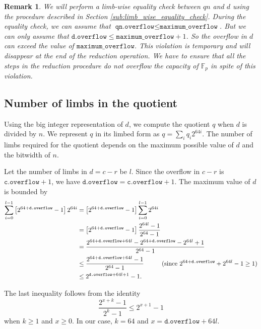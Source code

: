 \documentclass[a4paper, 12pt]{article}
\newtheorem*{remark}{Remark}
\begin{document}
\begin{remark}
  We will perform a limb-wise equality check between $qn$ and $d$ using the procedure described in Section \ref{sub:limb_wise_equality_check}. During the equality check, we can assume that $\texttt{qn.overflow} \le \texttt{maximum\_overflow}$. But we can only assume that $\texttt{d.overflow} \le \texttt{maximum\_overflow} + 1$. So the overflow in $d$ can exceed the value of $\texttt{maximum\_overflow}$. This violation is temporary and will disappear at the end of the reduction operation. We have to ensure that all the steps in the reduction procedure do not overflow the capacity of $\mathbb{F}_p$ in spite of this violation.
\end{remark}

\subsection{Number of limbs in the quotient}

Using the big integer representation of $d$, we compute the quotient $q$ when $d$ is divided by $n$. We represent $q$ in its limbed form as $q = \sum_{i} q_i 2^{64i}$. The number of limbs required for the quotient depends on the maximum possible value of $d$ and the bitwidth of $n$.

Let the number of limbs in $d = c-r$ be $l$. Since the overflow in $c-r$ is $\texttt{c.overflow}+1$, we have $\texttt{d.overflow} = \texttt{c.overflow}+1$. The maximum value of $d$ is bounded by 
\begin{align*}
\sum_{i=0}^{l-1} \left[2^{64 + \texttt{d.overflow}}-1\right]2^{64i} & = \left[2^{64 + \texttt{d.overflow}}-1\right]\sum_{i=0}^{l-1} 2^{64i} \\\
& =  \left[2^{64 + \texttt{d.overflow}}-1\right] \frac{2^{64l}-1}{2^{64}-1}\\
& = \frac{2^{64+\texttt{d.overflow}+64l}- 2^{64+\texttt{d.overflow}}-2^{64l} + 1}{2^{64}-1} \\
& \le \frac{2^{64+\texttt{d.overflow}+64l}-1}{2^{64}-1} \hspace{10mm} (\text{since } 2^{64 + \texttt{d.overflow}} + 2^{64l} - 1 \ge 1) \\
& \le 2^{\texttt{d.overflow} + 64l+1} -1.
\end{align*}
         
The last inequality follows from the identity 
$$\frac{2^{x+k}-1}{2^{k}-1} \le 2^{x+1}-1$$
when $k \ge 1$ and $x \ge 0$. In our case, $k=64$ and $x=\texttt{d.overflow}+64l$.
\end{document}
